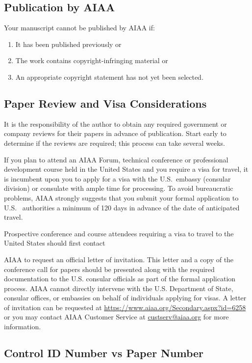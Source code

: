 \documentclass[conf]{new-aiaa}
\begin{document}
\subsection{Publication by AIAA}
Your manuscript cannot be published by AIAA if:
\begin{enumerate}
\item It has been published previously or

\item The work contains copyright-infringing material or

\item An appropriate copyright statement has not yet been selected.
\end{enumerate}

\subsection{Paper Review and Visa Considerations}

It is the responsibility of the author to obtain any required government or company reviews for their papers in advance of publication. Start early to determine if the reviews are required; this process can take several weeks.

If you plan to attend an AIAA Forum, technical conference or professional development course held in the United States and you require a visa for travel, it is incumbent upon you to apply for a visa with the U.S.~embassy (consular division) or consulate with ample time for processing.  To avoid bureaucratic problems, AIAA strongly suggests that you submit your formal application to U.S.~ authorities a minimum of 120 days in advance of the date of anticipated travel.

Prospective conference and course attendees requiring a visa to travel to the United States should first contact

AIAA to request an official letter of invitation. This letter and a copy of the conference call for papers should be presented along with the required documentation to the U.S. consular officials as part of the formal application process.  AIAA cannot directly intervene with the U.S. Department of State, consular offices, or embassies on behalf of individuals applying for visas. A letter of invitation can be requested at \url{https://www.aiaa.org/Secondary.aspx?id=6258} or you may contact AIAA Customer Service at \url{custserv@aiaa.org} for more information.

\subsection{Control ID Number vs Paper Number}
\end{document}
